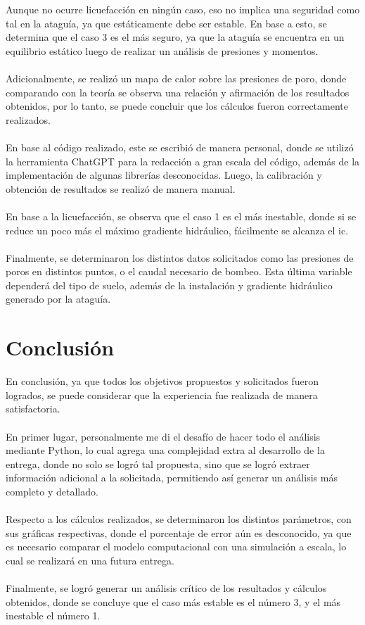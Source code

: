 Aunque no ocurre licuefacción en ningún caso, eso no implica una seguridad como tal en la ataguía, ya que estáticamente debe ser estable. En base a esto, se determina que el caso 3 es el más seguro, ya que la ataguía se encuentra en un equilibrio estático luego de realizar un análisis de presiones y momentos.
\\ \\
Adicionalmente, se realizó un mapa de calor sobre las presiones de poro, donde comparando con la teoría se observa una relación y afirmación de los resultados obtenidos, por lo tanto, se puede concluir que los cálculos fueron correctamente realizados.
\\ \\
En base al código realizado, este se escribió de manera personal, donde se utilizó la herramienta ChatGPT para la redacción a gran escala del código, además de la implementación de algunas librerías desconocidas. Luego, la calibración y obtención de resultados se realizó de manera manual.
\\ \\
En base a la licuefacción, se observa que el caso 1 es el más inestable, donde si se reduce un poco más el máximo gradiente hidráulico, fácilmente se alcanza el ic.
\\ \\
Finalmente, se determinaron los distintos datos solicitados como las presiones de poros en distintos puntos, o el caudal necesario de bombeo. Esta última variable dependerá del tipo de suelo, además de la instalación y gradiente hidráulico generado por la ataguía.

\section{Conclusión}

En conclusión, ya que todos los objetivos propuestos y solicitados fueron logrados, se puede considerar que la experiencia fue realizada de manera satisfactoria.
\\ \\
En primer lugar, personalmente me di el desafío de hacer todo el análisis mediante Python, lo cual agrega una complejidad extra al desarrollo de la entrega, donde no solo se logró tal propuesta, sino que se logró extraer información adicional a la solicitada, permitiendo así generar un análisis más completo y detallado.
\\ \\
Respecto a los cálculos realizados, se determinaron los distintos parámetros, con sus gráficas respectivas, donde el porcentaje de error aún es desconocido, ya que es necesario comparar el modelo computacional con una simulación a escala, lo cual se realizará en una futura entrega.
\\ \\
Finalmente, se logró generar un análisis crítico de los resultados y cálculos obtenidos, donde se concluye que el caso más estable es el número 3, y el más inestable el número 1.
